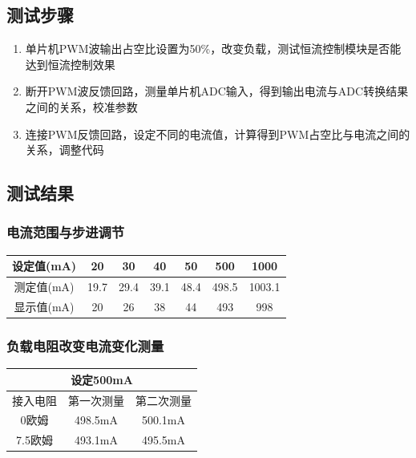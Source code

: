 \documentclass{zjureport}
\begin{document}
        \subsection{测试步骤}
        \begin{enumerate}
            \item 单片机PWM波输出占空比设置为50\%，改变负载，测试恒流控制模块是否能达到恒流控制效果
            \item  断开PWM波反馈回路，测量单片机ADC输入，得到输出电流与ADC转换结果之间的关系，校准参数
            \item 连接PWM反馈回路，设定不同的电流值，计算得到PWM占空比与电流之间的关系，调整代码
        \end{enumerate}
        
        \subsection{测试结果}
            \subsubsection{电流范围与步进调节}
            \begin{table}[thp]
                \centering
                \begin{tabular}{|c|c|c|c|c|c|c|}
                \hline
                设定值(mA) & 20   & 30   & 40   & 50   & 500   & 1000   \\ \hline
                测定值(mA) & 19.7 & 29.4 & 39.1 & 48.4 & 498.5 & 1003.1 \\ \hline
                显示值(mA) & 20   & 26   & 38   & 44   & 493   & 998    \\ \hline
                \end{tabular}
                \end{table}
            \subsubsection{负载电阻改变电流变化测量}
            \begin{table}[thp]
                \centering
                \begin{tabular}{|c|c|c|}
                \hline
                \multicolumn{3}{|c|}{设定500mA} \\ \hline
                接入电阻    & 第一次测量    & 第二次测量    \\ \hline
                0欧姆     & 498.5mA  & 500.1mA  \\ \hline
                7.5欧姆   & 493.1mA  & 495.5mA  \\ \hline
                \end{tabular}
                \end{table}
\end{document}
